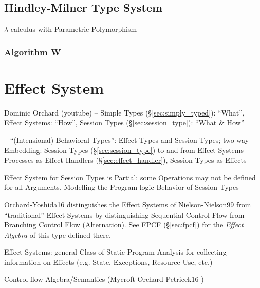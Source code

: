 \subsection{Hindley-Milner Type System}\label{sec:hindley_milner}

$\lambda$-calculus with Parametric Polymorphism



\subsubsection{Algorithm W}\label{sec:algorithm_w}



\section{Effect System}\label{sec:effect_system}

Dominic Orchard (youtube) -- Simple Types (\S\ref{sec:simply_typed}):
``What'', Effect Systems: ``How'', Session Types
(\S\ref{sec:session_type}): ``What \& How''

\cite{orchard-yoshida16} -- ``(Intensional) Behavioral Types'': Effect
Types and Session Types; two-way Embedding: Session Types
(\S\ref{sec:session_type}) to and from Effect Systems--Processes as
Effect Handlers (\S\ref{sec:effect_handler}), Session Types as Effects

Effect System for Session Types is Partial: some Operations may not be
defined for all Arguments, Modelling the Program-logic Behavior of
Session Types \cite{orchard-yoshida16} %

\fist Orchard-Yoshida16 \cite{orchard-yoshida16} distinguishes the
Effect Systems of Nielson-Nielson99 \cite{nielson-nielson99} from
``traditional'' Effect Systems by distinguishing Sequential Control
Flow from Branching Control Flow (Alternation). See FPCF
(\S\ref{sec:fpcf}) for the \emph{Effect Algebra} of this type defined
there.

Effect Systems: general Class of Static Program Analysis for
collecting information on Effects (e.g. State, Exceptions, Resource
Use, etc.) \cite{orchard-yoshida16}

Control-flow Algebra/Semantics (Mycroft-Orchard-Petricek16
\cite{mycroft-orchard-petricek16})

